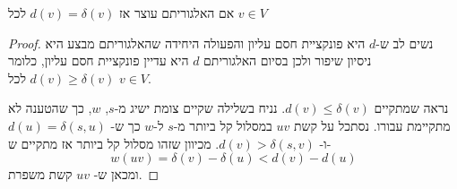 \begin{claim}
אם האלגוריתם עוצר אז 
$d(v) = \delta(v)$
לכל
$v \in V$
\end{claim}
\begin{proof}
נשים לב ש-$d$ היא פונקציית חסם עליון והפעולה היחידה שהאלגוריתם מבצע היא ניסיון שיפור ולכן
בסיום האלגוריתם $d$ היא עדיין פונקציית חסם עליון, כלומר 
$d(v) \geq \delta(v)$
לכל
$v \in V$.

נראה שמתקיים 
$d(v) \leq \delta(v)$.
נניח בשלילה שקיים צומת ישיג מ-$s$,
$w$,
כך שהטענה לא מתקיימת עבורו.
נסתכל על קשת 
$uv$
במסלול קל ביותר מ-$s$ ל-$w$
כך ש-%
$d(u) = \delta(s,u)$
ו-%
$d(v) > \delta(s,v)$.
מכיוון שזהו מסלול קל ביותר אז מתקיים ש-%
$$w(uv) = \delta(v) - \delta(u) < d(v) - d(u)$$
ומכאן ש-%
$uv$
קשת משפרת.

\end{proof}
